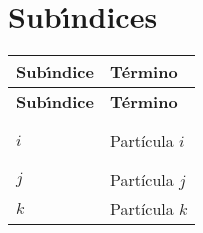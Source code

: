 \section*{Sub\'{\i}ndices}
\begin{longtable}{ll}
  \textbf{Sub\'{\i}ndice} & \textbf{T\'{e}rmino} \\[0.5ex] \hline%
  \endfirsthead%
  \textbf{Sub\'{\i}ndice} & \textbf{T\'{e}rmino} \\[0.5ex] \hline%
  \endhead%
\renewcommand{\arraystretch}{1.4}\label{simbolos4}

 $i$&Part\'{i}cula $i$\\%
 $j$&Part\'{i}cula $j$\\%
 $k$&Part\'{i}cula $k$\\%


\end{longtable}
\setlength{\extrarowheight}{0pt}